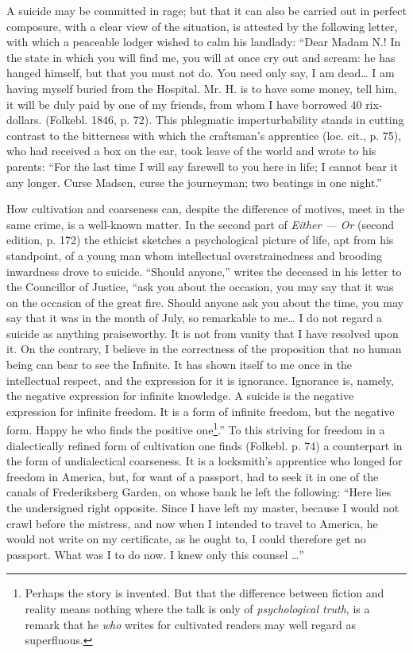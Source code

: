 \documentclass[12pt,a4paper,openany]{book}
\newcommand{\opage}[1]{\marginnote{\footnotesize\textit{[#1]}}}
\begin{document}
A suicide may be committed in rage; but that it can also be carried out in perfect composure, with a clear view of the situation, is attested by the following letter, with which a peaceable lodger wished to calm his landlady: ``Dear Madam N.! In the state in which you will find me, you will at once cry out and scream: he has hanged himself, but that you must not do. You need only say, I am dead\dots{} I am having myself buried from the Hospital. Mr. H. is to have some money, tell him, it will be duly paid by one of my friends, from whom I have borrowed 40 rix-dollars. (Folkebl. 1846, p. 72). This phlegmatic imperturbability stands in cutting contrast to the bitterness with which the craftsman's apprentice (loc. cit., p. 75), who had received a box on the ear, took leave of the world and wrote to his parents: ``For the last time I will say farewell to you here in life; I cannot bear it any longer. Curse Madsen, curse the journeyman; two beatings in one night.''

How cultivation and coarseness can, despite the difference of motives, meet in the same crime, is a well-known matter. In the second part of \emph{Either --- Or} (second edition, p. 172) the ethicist sketches a psychological picture of life, apt from his standpoint, of a young man whom intellectual overstrainedness and brooding inwardness drove to
\setcounter{footnote}{0}%
\opage{694}suicide. ``Should anyone,'' writes the deceased in his letter to the Councillor of Justice, ``ask you about the occasion, you may say that it was on the occasion of the great fire. Should anyone ask you about the time, you may say that it was in the month of July, so remarkable to me\dots{} I do not regard a suicide as anything praiseworthy. It is not from vanity that I have resolved upon it. On the contrary, I believe in the correctness of the proposition that no human being can bear to see the Infinite. It has shown itself to me once in the intellectual respect, and the expression for it is ignorance. Ignorance is, namely, the negative expression for infinite knowledge. A suicide is the negative expression for infinite freedom. It is a form of infinite freedom, but the negative form. Happy he who finds the positive one\footnote[1]{Perhaps the story is invented. But that the difference between fiction and reality means nothing where the talk is only of \emph{psychological truth}, is a remark that he \emph{who} writes for cultivated readers may well regard as superfluous.}.'' To %
this striving for freedom in a dialectically refined form of cultivation one finds (Folkebl. p. 74) a counterpart in the form of undialectical coarseness. It is a locksmith's apprentice who longed for freedom in America, but, for want of a passport, had to seek it in one of the canals of Frederiksberg Garden, on whose bank he left the following: ``Here lies the undersigned right opposite. Since I have left my master, because I would not crawl before the mistress, and now when I intended to travel to America, he would not write on my certificate, as he ought to, I could therefore get no passport. What was I to do now. I knew only this counsel \dots{}''
\end{document}
